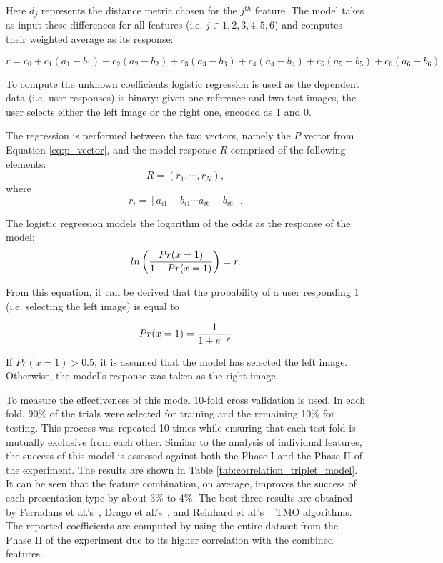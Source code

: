 Here $d_j$ represents the distance metric chosen for the $j^{th}$ feature. The model takes as input these differences for all features (i.e. $j \in {1, 2, 3, 4, 5, 6}$) and computes their weighted average as its response:

\begin{equation}
    r = c_0 + c_1(a_1 - b_1) + c_2(a_2 - b_2) + c_3(a_3 - b_3)+ c_4(a_4 - b_4) + c_5(a_5 - b_5) + c_6(a_6 - b_6)
\end{equation}
 

To compute the unknown coefficients logistic regression is used as the dependent data (i.e. user responses)
is binary: given one reference and two test images, the user selects either the left image or the right one,
encoded as 1 and 0.

The regression is performed between the two vectors, namely the $P$ vector from Equation \ref{eq:p_vector}, and the model response $R$ comprised of the following elements:
\begin{equation}
    R = (r_1,\cdots, r_N ),
\end{equation}
where
\begin{equation}
    r_i = [a_{i1} - b_{i1} \cdots a_{i6} - b_{i6}].
\end{equation}

The logistic regression models the logarithm of the odds as the response of the model:
\begin{equation}
   ln \left( {{Pr(x = 1)} \over { 1 - Pr(x = 1)}} \right) = r. 
\end{equation}


From this equation, it can be derived that the probability of a user responding 1 (i.e. selecting the left image) is equal to

\begin{equation}
\label{eq:response_prob}
    Pr(x = 1) = {{1} \over {1 + e^{-r}}}
\end{equation}

If $Pr(x = 1) > 0.5$, it is assumed that the model has selected the left image. Otherwise, the model’s response was taken as the right image.

To measure the effectiveness of this model 10-fold cross validation is used. In each fold, 90\% of the trials were selected for training and the remaining 10\% for testing. This process was repeated 10 times while ensuring that each test fold is mutually exclusive from each other. Similar to the analysis of individual features, the success of this model is assessed against both the Phase I and the Phase II of the experiment. The results are shown in Table \ref{tab:correlation_triplet_model}. It can be seen that the feature combination, on average, improves the success of each presentation type by about 3\% to 4\%. The best three results are obtained by Ferradans et al.’s~\cite{ferradans2011analysis}, Drago et al.’s~\cite{drago2003adaptive}, and Reinhard et al.’s ~\cite{reinhard2002photographic} TMO algorithms. The reported coefficients are computed by using the entire dataset from the Phase II of the experiment due to its higher correlation with the combined features.


